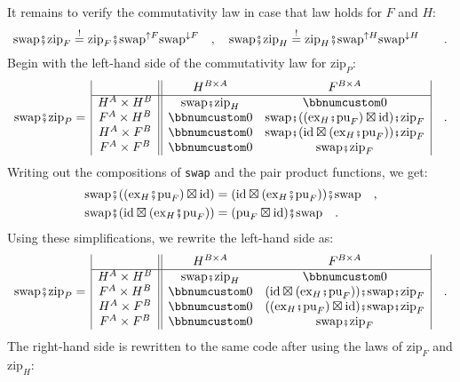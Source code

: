 It remains to verify the commutativity law in case that law holds
for $F$ and $H$:
\[
\text{swap}\bef\text{zip}_{F}\overset{!}{=}\text{zip}_{F}\bef\text{swap}^{\uparrow F}\text{swap}^{\downarrow F}\quad,\quad\text{swap}\bef\text{zip}_{H}\overset{!}{=}\text{zip}_{H}\bef\text{swap}^{\uparrow H}\text{swap}^{\downarrow H}\quad\quad.
\]
Begin with the left-hand side of the commutativity law for $\text{zip}_{P}$:
\[
\text{swap}\bef\text{zip}_{P}=\,\begin{array}{|c||cc|}
 & H^{B\times A} & F^{B\times A}\\
\hline H^{A}\times H^{B} & \text{swap}\bef\text{zip}_{H} & \bbnum 0\\
F^{A}\times H^{B} & \bbnum 0 & \text{swap}\bef((\text{ex}_{H}\bef\text{pu}_{F})\boxtimes\text{id})\bef\text{zip}_{F}\\
H^{A}\times F^{B} & \bbnum 0 & \text{swap}\bef(\text{id}\boxtimes(\text{ex}_{H}\bef\text{pu}_{F}))\bef\text{zip}_{F}\\
F^{A}\times F^{B} & \bbnum 0 & \text{swap}\bef\text{zip}_{F}
\end{array}\quad.
\]
Writing out the compositions of \lstinline!swap! and the pair product
functions, we get:
\begin{align*}
 & \text{swap}\bef((\text{ex}_{H}\bef\text{pu}_{F})\boxtimes\text{id})=(\text{id}\boxtimes(\text{ex}_{H}\bef\text{pu}_{F}))\bef\text{swap}\quad,\\
 & \text{swap}\bef(\text{id}\boxtimes(\text{ex}_{H}\bef\text{pu}_{F}))=(\text{pu}_{F}\boxtimes\text{id})\bef\text{swap}\quad.
\end{align*}
Using these simplifications, we rewrite the left-hand side as:
\[
\text{swap}\bef\text{zip}_{P}=\,\begin{array}{|c||cc|}
 & H^{B\times A} & F^{B\times A}\\
\hline H^{A}\times H^{B} & \text{swap}\bef\text{zip}_{H} & \bbnum 0\\
F^{A}\times H^{B} & \bbnum 0 & (\text{id}\boxtimes(\text{ex}_{H}\bef\text{pu}_{F}))\bef\text{swap}\bef\text{zip}_{F}\\
H^{A}\times F^{B} & \bbnum 0 & ((\text{ex}_{H}\bef\text{pu}_{F})\boxtimes\text{id})\bef\text{swap}\bef\text{zip}_{F}\\
F^{A}\times F^{B} & \bbnum 0 & \text{swap}\bef\text{zip}_{F}
\end{array}\quad.
\]
The right-hand side is rewritten to the same code after using the
laws of $\text{zip}_{F}$ and $\text{zip}_{H}$:
